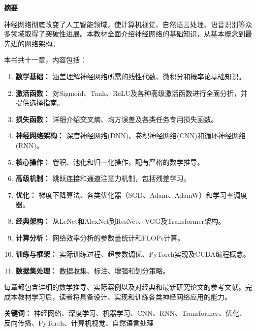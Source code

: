 % 
%
%

\newpage
\thispagestyle{empty}

\begin{center}
    \Large\textbf{摘要}
\end{center}

\vspace{1cm}

神经网络彻底改变了人工智能领域，使计算机视觉、自然语言处理、语音识别等众多领域取得了突破性进展。本教材全面介绍神经网络的基础知识，从基本概念到最先进的网络架构。

本书共十一章，内容包括：

\begin{enumerate}
    \item \textbf{数学基础：} 涵盖理解神经网络所需的线性代数、微积分和概率论基础知识。
    
    \item \textbf{激活函数：} 对Sigmoid、Tanh、ReLU及各种高级激活函数进行全面分析，并提供选择指南。
    
    \item \textbf{损失函数：} 详细介绍交叉熵、均方误差及各类任务专用损失函数。
    
    \item \textbf{神经网络架构：} 深度神经网络(DNN)、卷积神经网络(CNN)和循环神经网络(RNN)。
    
    \item \textbf{核心操作：} 卷积、池化和归一化操作，配有严格的数学推导。
    
    \item \textbf{高级机制：} 跳跃连接和通道注意力机制，包括残差学习。
    
    \item \textbf{优化：} 梯度下降算法、各类优化器（SGD、Adam、AdamW）和学习率调度器。
    
    \item \textbf{经典架构：} 从LeNet和AlexNet到ResNet、VGG及Transformer架构。
    
    \item \textbf{计算分析：} 网络效率分析的参数量统计和FLOPs计算。
    
    \item \textbf{训练与框架：} 实际训练过程、超参数调优、PyTorch实现及CUDA编程概念。
    
    \item \textbf{数据集处理：} 数据收集、标注、增强和划分策略。
\end{enumerate}

每章都包含详细的数学推导、实际案例以及对经典和最新研究论文的参考文献。完成本教材学习后，读者将具备设计、实现和训练各类神经网络应用的能力。

\vspace{2cm}

\textbf{关键词：} 神经网络、深度学习、机器学习、CNN、RNN、Transformer、优化、反向传播、PyTorch、计算机视觉、自然语言处理

\newpage
